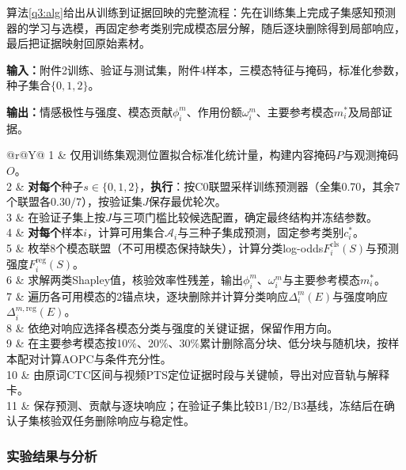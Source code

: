 算法\ref{q3:alg}给出从训练到证据回映的完整流程：先在训练集上完成子集感知预测器的学习与选模，再固定参考类别完成模态层分解，随后逐块删除得到局部响应，最后把证据映射回原始素材。

\begin{algorithm}[H]
\caption{ICF-Shapley预测与证据定位}\label{q3:alg}\small
\textbf{输入：}附件2训练、验证与测试集，附件4样本，三模态特征与掩码，标准化参数，种子集合$\{0,1,2\}$。\par
\textbf{输出：}情感极性与强度、模态贡献$\phi_i^m$、作用份额$\omega_i^m$、主要参考模态$m_i^*$及局部证据。\par
\medskip\noindent
\begin{tabularx}{\linewidth}{@{}r@{\quad}Y@{}}
1 & 仅用训练集观测位置拟合标准化统计量，构建内容掩码$P$与观测掩码$O$。\\
2 & \textbf{对每个}种子$s\in\{0,1,2\}$，\textbf{执行}：按C0联盟采样训练预测器（全集0.70，其余7个联盟各$0.30/7$），按验证集$J$保存最优轮次。\\
3 & 在验证子集上按$J$与三项门槛比较候选配置，确定最终结构并冻结参数。\\
4 & \textbf{对每个}样本$i$，计算可用集合$\mathcal A_i$与三种子集成预测，固定参考类别$c_i^*$。\\
5 & 枚举8个模态联盟（不可用模态保持缺失），计算分类log-odds$F_i^{\mathrm{cls}}(S)$与预测强度$F_i^{\mathrm{reg}}(S)$。\\
6 & 求解两类Shapley值，核验效率性残差，输出$\phi_i^m$、$\omega_i^m$与主要参考模态$m_i^*$。\\
7 & 遍历各可用模态的2锚点块，逐块删除并计算分类响应$\Delta_i^m(E)$与强度响应$\Delta_i^{m,\mathrm{reg}}(E)$。\\
8 & 依绝对响应选择各模态分类与强度的关键证据，保留作用方向。\\
9 & 在主要参考模态按10\%、20\%、30\%累计删除高分块、低分块与随机块，按样本配对计算AOPC与条件充分性。\\
10 & 由原词CTC区间与视频PTS定位证据时段与关键帧，导出对应音轨与解释卡。\\
11 & 保存预测、贡献与逐块响应；在验证子集比较B1/B2/B3基线，冻结后在确认子集核验双任务删除响应与稳定性。\\
\end{tabularx}\par
\end{algorithm}

\FloatBarrier
\subsubsection{实验结果与分析}
\FloatBarrier
